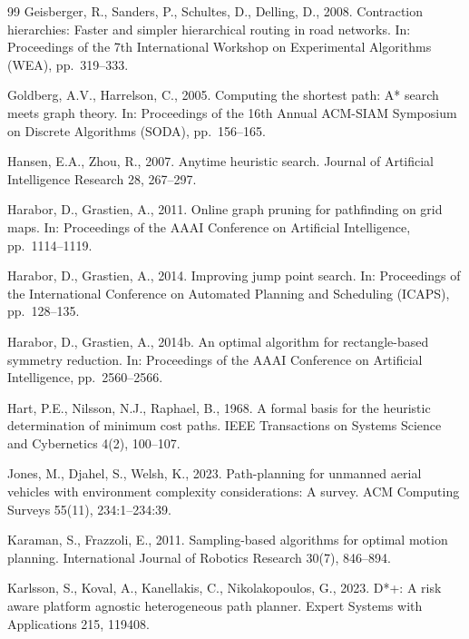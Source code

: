 \documentclass[preprint,12pt,authoryear]{elsarticle}
\begin{document}
\begin{thebibliography}{99}
Geisberger, R., Sanders, P., Schultes, D., Delling, D., 2008.
Contraction hierarchies: Faster and simpler hierarchical routing in road networks.
In: Proceedings of the 7th International Workshop on Experimental Algorithms (WEA), pp.\ 319--333.

Goldberg, A.V., Harrelson, C., 2005.
Computing the shortest path: A* search meets graph theory.
In: Proceedings of the 16th Annual ACM-SIAM Symposium on Discrete Algorithms (SODA), pp.\ 156--165.

Hansen, E.A., Zhou, R., 2007.
Anytime heuristic search.
Journal of Artificial Intelligence Research 28, 267--297.

Harabor, D., Grastien, A., 2011.
Online graph pruning for pathfinding on grid maps.
In: Proceedings of the AAAI Conference on Artificial Intelligence, pp.\ 1114--1119.

Harabor, D., Grastien, A., 2014.
Improving jump point search.
In: Proceedings of the International Conference on Automated Planning and Scheduling (ICAPS), pp.\ 128--135.

Harabor, D., Grastien, A., 2014b.
An optimal algorithm for rectangle-based symmetry reduction.
In: Proceedings of the AAAI Conference on Artificial Intelligence, pp.\ 2560--2566.

Hart, P.E., Nilsson, N.J., Raphael, B., 1968.
A formal basis for the heuristic determination of minimum cost paths.
IEEE Transactions on Systems Science and Cybernetics 4(2), 100--107.

Jones, M., Djahel, S., Welsh, K., 2023.
Path-planning for unmanned aerial vehicles with environment complexity considerations: A survey.
ACM Computing Surveys 55(11), 234:1--234:39.

Karaman, S., Frazzoli, E., 2011.
Sampling-based algorithms for optimal motion planning.
International Journal of Robotics Research 30(7), 846--894.

Karlsson, S., Koval, A., Kanellakis, C., Nikolakopoulos, G., 2023.
D*+: A risk aware platform agnostic heterogeneous path planner.
Expert Systems with Applications 215, 119408.


\end{thebibliography}
\end{document}
